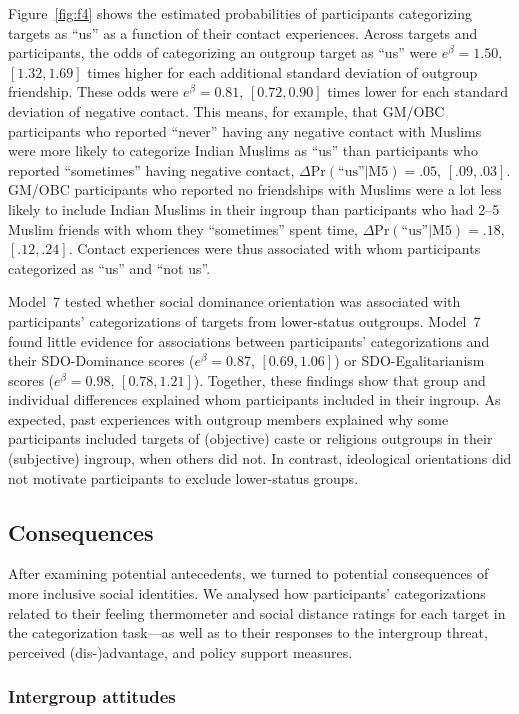 \documentclass[12pt, a4paper]{article}
\newcommand{\pdif}[4]{$ \Delta\text{Pr} (\text{``us''} | \text{#1}) = #2$, $[#3, #4]$}
\begin{document}
Figure~\ref{fig:f4} shows the estimated probabilities of participants categorizing targets as ``us'' as a function of their contact experiences. Across targets and participants, the odds of categorizing an outgroup target as ``us'' were $e^\beta = 1.50$, $[1.32, 1.69]$ times higher for each additional standard deviation of outgroup friendship. These odds were $e^\beta = 0.81$, $[0.72, 0.90]$ times lower for each standard deviation of negative contact. This means, for example, that GM/OBC participants who reported ``never'' having any negative contact with Muslims were more likely to categorize Indian Muslims as ``us'' than participants who reported ``sometimes'' having negative contact, \pdif{M5}{.05}{.09}{.03}. GM/OBC participants who reported no friendships with Muslims were a lot less likely to include Indian Muslims in their ingroup than participants who had 2--5 Muslim friends with whom they ``sometimes'' spent time, \pdif{M5}{.18}{.12}{.24}. Contact experiences were thus associated with whom participants categorized as ``us'' and ``not us''.

Model~7 tested whether social dominance orientation was associated with participants’ categorizations of targets from lower-status outgroups. Model~7 found little evidence for associations between participants’ categorizations and their SDO-Dominance scores ($e^\beta = 0.87$, $[0.69, 1.06]$) or SDO-Egalitarianism scores ($e^\beta = 0.98$, $[0.78, 1.21]$). Together, these findings show that group and individual differences explained whom participants included in their ingroup. As expected, past experiences with outgroup members explained why some participants included targets of (objective) caste or religions outgroups in their (subjective) ingroup, when others did not. In contrast, ideological orientations did not motivate participants to exclude lower-status groups.

\subsection{Consequences}

After examining potential antecedents, we turned to potential consequences of more inclusive social identities. We analysed how participants' categorizations related to their feeling thermometer and social distance ratings for each target in the categorization task---as well as to their responses to the intergroup threat, perceived (dis-)advantage, and policy support measures. 

\subsubsection{Intergroup attitudes}
\end{document}
